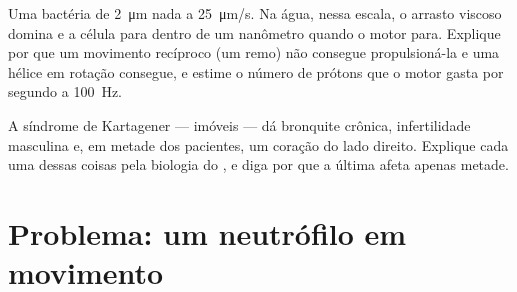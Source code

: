 \begin{exercise}[$\star\star\star$]\label{exo:b3:cytoskeleton-motility:11}
Uma bactéria de \qty{2}{\micro m} nada a \qty{25}{\micro m/s}. Na água,
nessa escala, o arrasto viscoso domina e a célula para dentro de um
nanômetro quando o motor para. Explique por que um movimento recíproco
(um remo) não consegue propulsioná-la e uma hélice em rotação consegue,
e estime o número de prótons que o motor gasta por segundo a
\qty{100}{Hz}.
\end{exercise}

\begin{exercise}[$\star\star\star$]\label{exo:b3:cytoskeleton-motility:12}
A síndrome de Kartagener ---  imóveis --- dá bronquite crônica,
infertilidade masculina e, em metade dos pacientes, um coração do lado
direito. Explique cada uma dessas coisas pela biologia do , e
diga por que a última afeta apenas metade.
\end{exercise}

\section{Problema: um neutrófilo em movimento}

